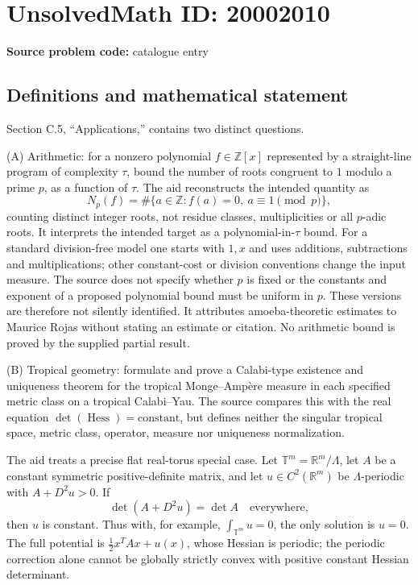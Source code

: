 \documentclass[11pt]{article}
\newcommand{\Z}{\mathbb{Z}}
\newcommand{\R}{\mathbb{R}}
\begin{document}
\section*{UnsolvedMath ID: 20002010}
\textbf{Source problem code:} catalogue entry
\subsection{Definitions and mathematical statement}
Section C.5, ``Applications,'' contains two distinct questions.

(A) Arithmetic: for a nonzero polynomial \(f\in\Z[x]\) represented by a straight-line program of complexity \(\tau\), bound the number of roots congruent to \(1\) modulo a prime \(p\), as a function of \(\tau\). The aid reconstructs the intended quantity as
\[
 N_p(f)=\#\{a\in\Z:f(a)=0,\ a\equiv1\pmod p\},
\]
counting distinct integer roots, not residue classes, multiplicities or all \(p\)-adic roots. It interprets the intended target as a polynomial-in-\(\tau\) bound. For a standard division-free model one starts with \(1,x\) and uses additions, subtractions and multiplications; other constant-cost or division conventions change the input measure. The source does not specify whether \(p\) is fixed or the constants and exponent of a proposed polynomial bound must be uniform in \(p\). These versions are therefore not silently identified. It attributes amoeba-theoretic estimates to Maurice Rojas without stating an estimate or citation. No arithmetic bound is proved by the supplied partial result.

(B) Tropical geometry: formulate and prove a Calabi-type existence and uniqueness theorem for the tropical Monge--Amp\`ere measure in each specified metric class on a tropical Calabi--Yau. The source compares this with the real equation \(\det(\operatorname{Hess})=\text{constant}\), but defines neither the singular tropical space, metric class, operator, measure nor uniqueness normalization.

The aid treats a precise flat real-torus special case. Let \(\mathbb T^m=\R^m/\Lambda\), let \(A\) be a constant symmetric positive-definite matrix, and let \(u\in C^2(\R^m)\) be \(\Lambda\)-periodic with \(A+D^2u>0\). If
\[
 \det(A+D^2u)=\det A\quad\text{everywhere},
\]
then \(u\) is constant. Thus with, for example, \(\int_{\mathbb T^m}u=0\), the only solution is \(u=0\). The full potential is \(\tfrac12x^TAx+u(x)\), whose Hessian is periodic; the periodic correction alone cannot be globally strictly convex with positive constant Hessian determinant.
\end{document}
